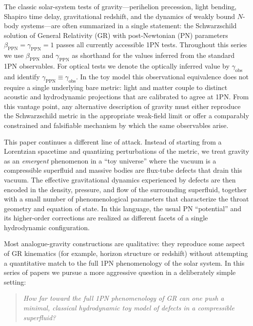 \documentclass[11pt]{article}
\begin{document}
The classic solar-system tests of gravity---perihelion precession, light bending,
Shapiro time delay, gravitational redshift, and the dynamics of weakly bound
$N$-body systems---are often summarized in a single statement:
the Schwarzschild solution of General Relativity (GR) with post-Newtonian (PN)
parameters $\beta_{\mathrm{PPN}} = \gamma_{\mathrm{PPN}} = 1$ passes all currently accessible 1PN tests.
Throughout this series we use $\beta_{\mathrm{PPN}}$ and $\gamma_{\mathrm{PPN}}$
as shorthand for the values inferred from the standard 1PN observables.
For optical tests we denote the optically inferred value by $\gamma_{\mathrm{obs}}$
and identify $\gamma_{\mathrm{PPN}}\equiv\gamma_{\mathrm{obs}}$.
In the toy model this observational equivalence does not require a single
underlying bare metric: light and matter couple to distinct acoustic and
hydrodynamic projections that are calibrated to agree at 1PN.
From this vantage point, any alternative description of gravity must either
reproduce the Schwarzschild metric in the appropriate weak-field limit or offer
a comparably constrained and falsifiable mechanism by which the same observables
arise.

This paper continues a different line of attack.
Instead of starting from a Lorentzian spacetime and quantizing perturbations of
the metric, we treat gravity as an \emph{emergent} phenomenon in a ``toy
universe'' where the vacuum is a compressible superfluid and massive bodies are
flux-tube defects that drain this vacuum.
The effective gravitational dynamics experienced by defects are then encoded in
the density, pressure, and flow of the surrounding superfluid, together with a
small number of phenomenological parameters that characterize the throat
geometry and equation of state.
In this language, the usual PN ``potential'' and its higher-order corrections
are realized as different facets of a single hydrodynamic configuration.

Most analogue-gravity constructions are qualitative: they reproduce some aspect
of GR kinematics (for example, horizon structure or redshift) without attempting
a quantitative match to the full 1PN phenomenology of the solar system.
In this series of papers we pursue a more aggressive question in a deliberately
simple setting:
\medskip

\begin{quote}
\emph{How far toward the full 1PN phenomenology of GR can one push a
minimal, classical hydrodynamic toy model of defects in a compressible
superfluid?}
\end{quote}
\end{document}
